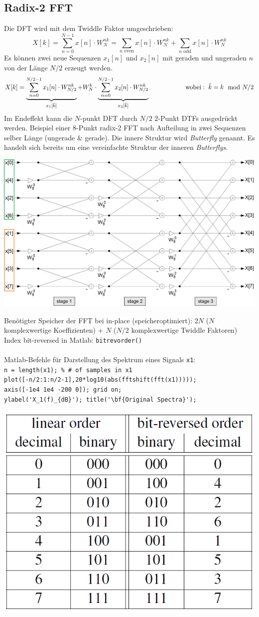\subsection{Radix-2 FFT}
Die DFT wird mit dem Twiddle Faktor umgeschrieben:
\[ X[k] = \sum_{n=0}^{N-1} x[n] \cdot W_N^{nk}
	= \sum_{n \textrm{ even}} x[n] \cdot W_N^{nk} + \sum_{n\textrm{ odd}}x[n] \cdot W_N^{nk}
\]
Es können zwei neue Sequenzen $x_1[n]$ und $x_2[n]$ mit geraden und ungeraden
$n$ von der Länge $N/2$ erzeugt werden.
\[ X[k] = \underbrace{\sum_{n=0}^{N/2-1}x_1[n] \cdot W_{N/2}^{nk}}_{x_1[\tilde{k}]} +
	W_N^k\cdot \underbrace{\sum_{n=0}^{N/2-1} x_2[n] \cdot W_{N/2}^{nk}}_
	{{x_2[\tilde{k}]}} \hspace{20mm} \mathrm{wobei:} \hspace{2mm} \tilde{k} = k\mod N/2 \]
Im Endeffekt kann die $N$-punkt DFT durch $N/2$ 2-Punkt DTFs ausgedrückt werden. 
Beispiel einer 8-Punkt radix-2 FFT nach Aufteilung in zwei Sequenzen selber Länge (ungerade \& gerade).
Die innere Struktur wird \emph{Butterfly} genannt. Es handelt sich bereits um eine vereinfachte
Struktur der inneren \emph{Butterflys}.
\begin{center}
	\includegraphics[width=.8\textwidth]{../fig/fft}
\end{center}
Benötigter Speicher der FFT bei in-place (speicheroptimiert): $2N$ ($N$ komplexwertige Koeffizienten) + $N$ ($N/2$ komplexwertige Twiddle Faktoren)\\
Index bit-reversed in Matlab: \verb|bitrevorder()|\\\\
Matlab-Befehle für Darstellung des Spektrum eines Signals \verb|x1|:\\
\verb|n = length(x1); % # of samples in x1|\\
\verb|plot([-n/2:1:n/2-1],20*log10(abs(fftshift(fft(x1)))));|\\
\verb|axis([-1e4 1e4 -200 0]); grid on;|\\
\verb|ylabel('X_1(f)_{dB}'); title('\bf{Original Spectra}');|\\
\begin{center}
	\includegraphics[width=.3\textwidth]{../fig/bit_reversed_order}
\end{center}
\newpage

